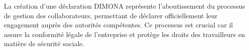\vspace{0.5cm}

\begin{tcolorbox}[
  title={\textbf{Importance des déclarations DIMONA}},
  colback=blue!5!white,
  colframe=primarycolor,
  fonttitle=\bfseries,
  boxrule=0.5mm,
  arc=2mm,
  left=6mm,
  right=6mm,
  top=6mm,
  bottom=6mm
]
La création d'une déclaration DIMONA représente l'aboutissement du processus de gestion des collaborateurs, permettant de déclarer officiellement leur engagement auprès des autorités compétentes. Ce processus est crucial car il assure la conformité légale de l'entreprise et protège les droits des travailleurs en matière de sécurité sociale.
\end{tcolorbox}






